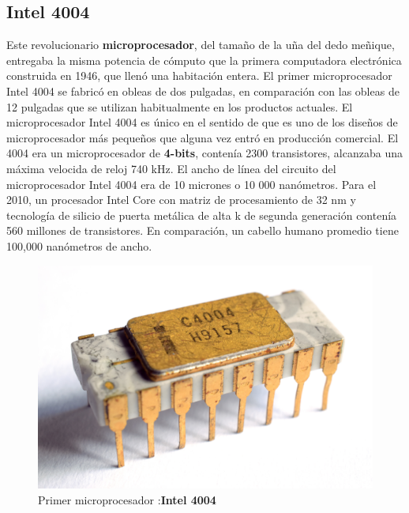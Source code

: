 \subsection{Intel 4004}

Este revolucionario \textbf{microprocesador}, del tamaño de la uña del dedo meñique, entregaba la misma potencia de cómputo que la primera computadora electrónica construida 
en 1946, que llenó una habitación entera. El primer microprocesador Intel 4004 se fabricó en obleas de dos pulgadas, en comparación con las obleas de 12 
pulgadas que se utilizan habitualmente en los productos actuales. El microprocesador Intel 4004 es único en el sentido de que es uno de los diseños de 
microprocesador más pequeños que alguna vez entró en producción comercial. El 4004  era un microprocesador de \textbf{4-bits}, contenía 2300 transistores, alcanzaba 
una máxima velocida de reloj 740 kHz. El ancho de línea del circuito del microprocesador Intel 4004 era de 10 micrones o 10 000 nanómetros. 
Para el 2010, un procesador Intel Core con matriz de procesamiento de 32 nm y tecnología de silicio de puerta metálica de alta k de segunda generación contenía 
560 millones de transistores. En comparación, un cabello humano promedio tiene 100,000 nanómetros de ancho.      

\begin{figure}[htb]
	\centering
	\includegraphics[scale = 0.2]{Graphics/Intel_C4004.jpg}
	\caption{Primer microprocesador :\textbf{Intel 4004}}
	\label{fig:11}
\end{figure}


\section{}


